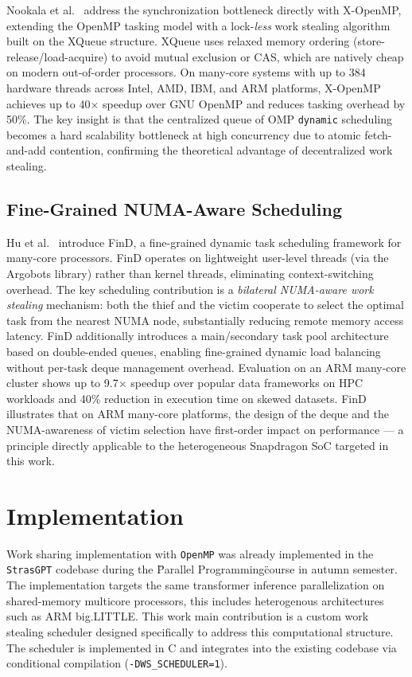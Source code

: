 \documentclass[11pt,english]{article}
\begin{document}
    Nookala et al.~\cite{nookala2024xopenmp} address the synchronization bottleneck directly with X-OpenMP, extending the OpenMP tasking model with a lock-\emph{less} work stealing algorithm built on the XQueue structure. XQueue uses relaxed memory ordering (store-release/load-acquire) to avoid mutual exclusion or CAS, which are natively cheap on modern out-of-order processors. On many-core systems with up to 384 hardware threads across Intel, AMD, IBM, and ARM platforms, X-OpenMP achieves up to 40$\times$ speedup over GNU OpenMP and reduces tasking overhead by 50\%. The key insight is that the centralized queue of OMP \texttt{dynamic} scheduling becomes a hard scalability bottleneck at high concurrency due to atomic fetch-and-add contention, confirming the theoretical advantage of decentralized work stealing.
 
    \subsection{Fine-Grained NUMA-Aware Scheduling}
 
    Hu et al.~\cite{hu2023find} introduce FinD, a fine-grained dynamic task scheduling framework for many-core processors. FinD operates on lightweight user-level threads (via the Argobots library) rather than kernel threads, eliminating context-switching overhead. The key scheduling contribution is a \emph{bilateral NUMA-aware work stealing} mechanism: both the thief and the victim cooperate to select the optimal task from the nearest NUMA node, substantially reducing remote memory access latency. FinD additionally introduces a main/secondary task pool architecture based on double-ended queues, enabling fine-grained dynamic load balancing without per-task deque management overhead. Evaluation on an ARM many-core cluster shows up to 9.7$\times$ speedup over popular data frameworks on HPC workloads and 40\% reduction in execution time on skewed datasets. FinD illustrates that on ARM many-core platforms, the design of the deque and the NUMA-awareness of victim selection have first-order impact on performance --- a principle directly applicable to the heterogeneous Snapdragon SoC targeted in this work.


\section{Implementation}

Work sharing implementation with \texttt{OpenMP} was already implemented in the \texttt{StrasGPT} codebase during the \"Parallel Programming\" course in autumn semester. The implementation targets the same transformer inference parallelization on shared-memory multicore processors, this includes heterogenous architectures such as ARM big.LITTLE. This work main contribution is a custom work stealing scheduler designed specifically to address this computational structure. The scheduler is implemented in C and integrates into the existing codebase via conditional compilation (\texttt{-DWS\_SCHEDULER=1}).
 
\end{document}
